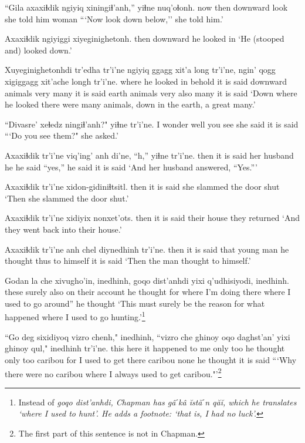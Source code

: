 \documentclass[12pt]{article}
\begin{document}
\gll ``Gila axaxiɬdik ngiyiq xiningiɬ'anh,'' yiɬne  nuq'oɬonh.
now  then  downward look {she told him} woman
\glt ```Now look down below,'' she told him.'
\glend

\gll Axaxiɬdik ngiyiggi  xiyeginighetonh.
then  downward  {he looked in} 
\glt `He (stooped and) looked down.'
\glend

\gll Xuyeginighetonhdi tr'edha tr'i'ne ngiyiq ggagg  xit'a long tr'i'ne, ngin' qogg xigiggagg xit'ache longh tr'i'ne.
{where he looked in}  behold  {it is said} downward animals very many {it is said} earth animals very also many {it is said}
\glt `Down where he looked there were many animals, down in the earth, a great many.'
\glend

\gll ``Divasre' xeɬedz ningiɬ'anh?" yiɬne  tr'i'ne.
{I wonder} well {you see}  {she said} {it is said}
\glt ```Do you see them?" she asked.'
\glend

\gll Axaxiɬdik tr'i'ne viq'ing' anh di'ne, ``h,'' yiɬne tr'i'ne.
then  {it is said} {her husband} he {he said} ``yes,'' {he said} {it is said}
\glt `And her husband answered, ``Yes.'''
\glend

\gll Axaxiɬdik tr'i'ne xidon-gidiniɬtsitl.
then  {it is said} {she slammed the door shut}
\glt `Then she slammed the door shut.'
\glend

\gll Axaxiɬdik tr'i'ne xidiyix nonxet'ots.
then  {it is said} {their house} {they returned}
\glt `And they went back into their house.'
\glend

\gll Axaxiɬdik tr'i'ne anh chel  diynedhinh  tr'i'ne.
then  {it is said} that {young man} {he thought thus to himself} {it is said} 
\glt `Then the man thought to himself.'
\glend

\gll Godan la che xivugho'in,  inedhinh, goqo dist'anhdi yixi q'udhisiyodi,  inedhinh.
these surely also {on their account} {he thought} for {where I'm doing} there {where I used to go around}'' {he thought}
\glt `This must surely be the reason for what happened where I used to go hunting.'\footnote{Instead of \em goqo dist'anhdi, \em Chapman has \em g\^aˊk\^a \u{i}st\u{a}ˊn q\u{a}\u{i}, \em which he translates `where I used to hunt'. He adds a footnote: `that is, I had no luck'.}
\glend

\gll ``Go deg sixidiyoq vizro chenh," inedhinh, ``vizro che ghinoy oqo daghst'an' yixi ghinoy qul," inedhinh tr'i'ne.
this here {it happened to me} only too  {he thought} only too caribou for {I used to get} there caribou none {he thought} {it is said}
\glt ```Why there were no caribou where I always used to get caribou."'\footnote{The first part of this sentence is not in Chapman.}
\glend
\end{document}
